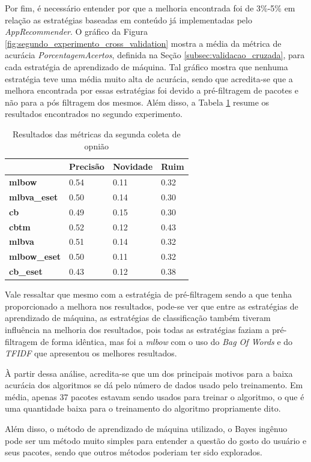 Por fim, é necessário entender por que a melhoria encontrada foi de 3\%-5\% em
relação as estratégias baseadas em conteúdo já implementadas pelo
\textit{AppRecommender}. O gráfico da Figura \ref{fig:segundo_experimento_cross_validation}
mostra a média da métrica de acurácia \textit{PorcentagemAcertos}, definida na Seção
\ref{subsec:validacao_cruzada}, para cada estratégia de aprendizado de máquina.
Tal gráfico mostra que nenhuma estratégia teve uma média muito alta de acurácia,
sendo que acredita-se que a melhora encontrada por essas estratégias foi devido a
pré-filtragem de pacotes e não para a pós filtragem dos mesmos. Além disso, a
Tabela \ref{tab:resultados_p2} resume os resultados encontrados no segundo
experimento.

\begin{table}[]
    \centering
    \begin{tabular}{|l|l|l|l|}
        \hline
        & \textbf{Precisão} & \textbf{Novidade} & \textbf{Ruim} \\ \hline
        \textbf{mlbow}       & 0.54     & 0.11     & 0.32 \\ \hline
        \textbf{mlbva\_eset} & 0.50     & 0.14     & 0.30 \\ \hline
        \textbf{cb}          & 0.49     & 0.15     & 0.30 \\ \hline
        \textbf{cbtm}        & 0.52     & 0.12     & 0.43 \\ \hline
        \textbf{mlbva}       & 0.51     & 0.14     & 0.32 \\ \hline
        \textbf{mlbow\_eset} & 0.50     & 0.11     & 0.32 \\ \hline
        \textbf{cb\_eset}    & 0.43     & 0.12     & 0.38 \\ \hline
    \end{tabular}
    \caption{Resultados das métricas da segunda coleta de opnião}
    \label{tab:resultados_p2}
\end{table}

Vale ressaltar que mesmo com a estratégia de pré-filtragem sendo a que tenha
proporcionado a melhora nos resultados, pode-se ver que entre as estratégias de
aprendizado de máquina, as estratégias de classificação também tiveram influência
na melhoria dos resultados, pois todas as estratégias faziam a pré-filtragem de
forma idêntica, mas foi a \textit{mlbow} com o uso do \textit{Bag Of Words} e do
\textit{TFIDF} que apresentou os melhores resultados.

À partir dessa análise, acredita-se que um dos principais motivos para a baixa acurácia dos algoritmos
se dá pelo número de dados usado pelo treinamento. Em média, apenas 37 pacotes
estavam sendo usados para treinar o algoritmo, o que é uma
quantidade baixa para o treinamento do algoritmo propriamente dito.

Além disso, o método de aprendizado de máquina utilizado, o Bayes ingênuo pode
ser um método muito simples para entender a questão do gosto do usuário e seus
pacotes, sendo que outros métodos poderiam ter sido explorados.
